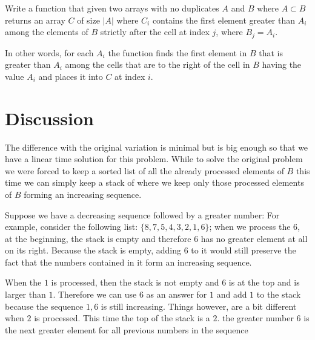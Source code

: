 \begin{exercise}
	\label{example:next_greater_element:exercice2}
	Write a function that given two arrays with no duplicates $A$ and $B$ where $A \subset B$ returns an
	array $C$ of size $|A|$ where $C_i$ contains the first element greater than $A_i$ among the elements of $B$ 
	strictly after the cell at index $j$, where $B_j = A_i$.
	
	In other words, for each $A_i$ the function finds the first element in $B$ that is greater than
	$A_i$ among the cells that are to the right of the cell in $B$ having the value $A_i$ and places it
	into $C$ at index $i$.

\end{exercise}

\section{Discussion}
\label{next_greater_element:sec:variation1:discussion}
The difference with the original variation is minimal but is big enough so that we have a linear time solution for this problem. 
While to solve the original problem  we were forced to keep a sorted list of all the already processed elements of $B$ this time we can 
simply keep a stack of where we keep only those processed elements of $B$ forming an increasing sequence.

Suppose we have a decreasing sequence followed by a greater number: 
For example, consider the following list: $\{8,7,5, 4, 3, 2, 1, 6\}$;  when we process the $6$, at the beginning, the stack is empty and therefore $6$ has no
greater element at all on its right. Because the stack is empty, adding $6$ to it would still preserve the fact that the numbers contained in it form an increasing sequence.

When the $1$ is processed, then the stack is not empty and $6$ is at the top and is larger than $1$. Therefore we can use $6$ as an answer for $1$ and add $1$ to the stack
because the sequence $1,6$ is still increasing. 
Things however, are a bit different when $2$ is processed. This time the top of the stack is a $2$.
 the greater number 6 is the next greater element for all previous numbers in the sequence




